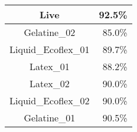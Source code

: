 \begin{tabular}{ c   r }
    Live               & 92.5\% \\ \hline\hline
    Gelatine\_02       & 85.0\% \\
    Liquid\_Ecoflex\_01& 89.7\% \\
    Latex\_01          & 88.2\% \\
    Latex\_02          & 90.0\% \\
    Liquid\_Ecoflex\_02& 90.0\% \\
    Gelatine\_01       & 90.5\% \\
\end{tabular}








